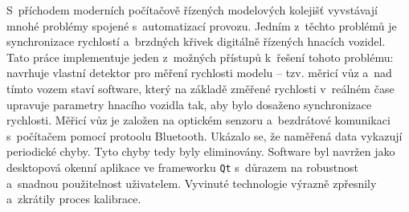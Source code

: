 S~příchodem moderních počítačově řízených modelových kolejišť vyvstávají mnohé
problémy spojené s~automatizací provozu. Jedním z~těchto problémů je
synchronizace rychlostí a~brzdných křivek digitálně řízených hnacích vozidel.
Tato práce implementuje jeden z~možných přístupů k~řešení tohoto problému:
navrhuje vlastní detektor pro měření rychlosti modelu -- tzv. měricí vůz a~nad
tímto vozem staví software, který na základě změřené rychlosti v~reálném čase
upravuje parametry hnacího vozidla tak, aby bylo dosaženo synchronizace
rychlosti. Měřicí vůz je založen na optickém senzoru a~bezdrátové komunikaci
s~počítačem pomocí protoolu Bluetooth. Ukázalo se, že naměřená data vykazují
periodické chyby. Tyto chyby tedy byly eliminovány. Software byl navržen jako
desktopová okenní aplikace ve frameworku \texttt{Qt} s~důrazem na robustnost
a~snadnou použitelnost uživatelem. Vyvinuté technologie výrazně zpřesnily
a~zkrátily proces kalibrace.
